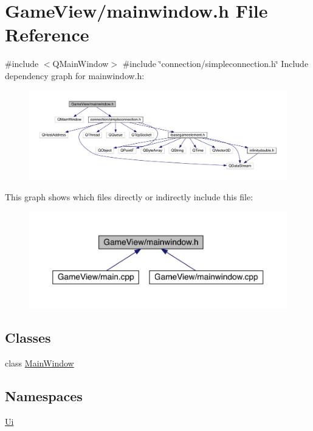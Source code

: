 \hypertarget{a00083}{}\section{Game\+View/mainwindow.h File Reference}
\label{a00083}
{\ttfamily \#include $<$Q\+Main\+Window$>$}\newline
{\ttfamily \#include \char`\"{}connection/simpleconnection.\+h\char`\"{}}\newline
Include dependency graph for mainwindow.\+h\+:
\nopagebreak
\begin{figure}[H]
\begin{center}
\leavevmode
\includegraphics[width=350pt]{df/d5d/a00084}
\end{center}
\end{figure}
This graph shows which files directly or indirectly include this file\+:
\nopagebreak
\begin{figure}[H]
\begin{center}
\leavevmode
\includegraphics[width=350pt]{df/d13/a00085}
\end{center}
\end{figure}
\subsection*{Classes}
\begin{DoxyCompactItemize}
\item 
class \hyperlink{a00177}{Main\+Window}
\end{DoxyCompactItemize}
\subsection*{Namespaces}
\begin{DoxyCompactItemize}
\item 
 \hyperlink{a00113}{Ui}
\end{DoxyCompactItemize}
